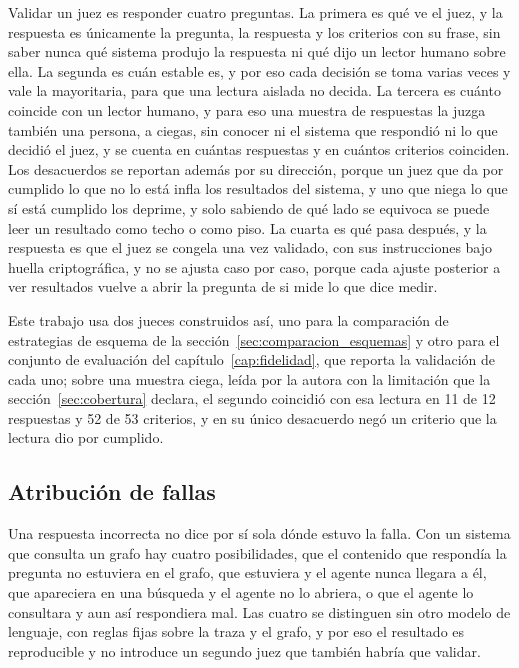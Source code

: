 \documentclass[12pt,a4paper]{report}
\begin{document}
Validar un juez es responder cuatro preguntas. La primera es qué ve el juez, y la respuesta es únicamente la pregunta, la respuesta y los criterios con su frase, sin saber nunca qué sistema produjo la respuesta ni qué dijo un lector humano sobre ella. La segunda es cuán estable es, y por eso cada decisión se toma varias veces y vale la mayoritaria, para que una lectura aislada no decida. La tercera es cuánto coincide con un lector humano, y para eso una muestra de respuestas la juzga también una persona, a ciegas, sin conocer ni el sistema que respondió ni lo que decidió el juez, y se cuenta en cuántas respuestas y en cuántos criterios coinciden. Los desacuerdos se reportan además por su dirección, porque un juez que da por cumplido lo que no lo está infla los resultados del sistema, y uno que niega lo que sí está cumplido los deprime, y solo sabiendo de qué lado se equivoca se puede leer un resultado como techo o como piso. La cuarta es qué pasa después, y la respuesta es que el juez se congela una vez validado, con sus instrucciones bajo huella criptográfica, y no se ajusta caso por caso, porque cada ajuste posterior a ver resultados vuelve a abrir la pregunta de si mide lo que dice medir.

Este trabajo usa dos jueces construidos así, uno para la comparación de estrategias de esquema de la sección~\ref{sec:comparacion_esquemas} y otro para el conjunto de evaluación del capítulo~\ref{cap:fidelidad}, que reporta la validación de cada uno; sobre una muestra ciega, leída por la autora con la limitación que la sección~\ref{sec:cobertura} declara, el segundo coincidió con esa lectura en 11 de 12 respuestas y 52 de 53 criterios, y en su único desacuerdo negó un criterio que la lectura dio por cumplido.

\subsection{Atribución de fallas}

Una respuesta incorrecta no dice por sí sola dónde estuvo la falla. Con un sistema que consulta un grafo hay cuatro posibilidades, que el contenido que respondía la pregunta no estuviera en el grafo, que estuviera y el agente nunca llegara a él, que apareciera en una búsqueda y el agente no lo abriera, o que el agente lo consultara y aun así respondiera mal. Las cuatro se distinguen sin otro modelo de lenguaje, con reglas fijas sobre la traza y el grafo, y por eso el resultado es reproducible y no introduce un segundo juez que también habría que validar.
\end{document}
